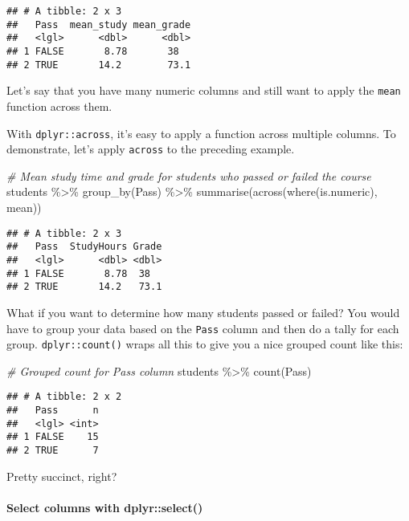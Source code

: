\documentclass[
]{article}
\newenvironment{Shaded}{\begin{snugshade}}{\end{snugshade}}
\newcommand{\CommentTok}[1]{\textcolor[rgb]{0.56,0.35,0.01}{\textit{#1}}}
\newcommand{\FunctionTok}[1]{\textcolor[rgb]{0.00,0.00,0.00}{#1}}
\newcommand{\NormalTok}[1]{#1}
\newcommand{\SpecialCharTok}[1]{\textcolor[rgb]{0.00,0.00,0.00}{#1}}
\begin{document}
\begin{verbatim}
## # A tibble: 2 x 3
##   Pass  mean_study mean_grade
##   <lgl>      <dbl>      <dbl>
## 1 FALSE       8.78       38  
## 2 TRUE       14.2        73.1
\end{verbatim}

Let's say that you have many numeric columns and still want to apply the
\texttt{mean} function across them.

With \texttt{dplyr::across}, it's easy to apply a function across
multiple columns. To demonstrate, let's apply \texttt{across} to the
preceding example.

\begin{Shaded}
\begin{Highlighting}[]
\CommentTok{\# Mean study time and grade for students who passed or failed the course}
\NormalTok{students }\SpecialCharTok{\%\textgreater{}\%} 
  \FunctionTok{group\_by}\NormalTok{(Pass) }\SpecialCharTok{\%\textgreater{}\%} 
  \FunctionTok{summarise}\NormalTok{(}\FunctionTok{across}\NormalTok{(}\FunctionTok{where}\NormalTok{(is.numeric), mean))}
\end{Highlighting}
\end{Shaded}

\begin{verbatim}
## # A tibble: 2 x 3
##   Pass  StudyHours Grade
##   <lgl>      <dbl> <dbl>
## 1 FALSE       8.78  38  
## 2 TRUE       14.2   73.1
\end{verbatim}

What if you want to determine how many students passed or failed? You
would have to group your data based on the \texttt{Pass} column and then
do a tally for each group. \texttt{dplyr::count()} wraps all this to
give you a nice grouped count like this:

\begin{Shaded}
\begin{Highlighting}[]
\CommentTok{\# Grouped count for Pass column}
\NormalTok{students }\SpecialCharTok{\%\textgreater{}\%} 
  \FunctionTok{count}\NormalTok{(Pass)}
\end{Highlighting}
\end{Shaded}

\begin{verbatim}
## # A tibble: 2 x 2
##   Pass      n
##   <lgl> <int>
## 1 FALSE    15
## 2 TRUE      7
\end{verbatim}

Pretty succinct, right?

\hypertarget{select-columns-with-dplyrselect}{%
\paragraph{Select columns with
dplyr::select()}\label{select-columns-with-dplyrselect}}
\end{document}
